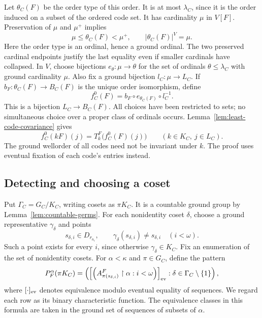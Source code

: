 Let $\theta_C(F)$ be the order type of this order. It is at most
$\lambda_C$, since it is the order induced on a subset of the ordered
code set. It has cardinality $\mu$ in $V[F]$. Preservation of $\mu$
and $\mu^+$ implies
\[
 \mu\le\theta_C(F)<\mu^+,
 \qquad |\theta_C(F)|^V=\mu.
\]
Here the order type is an ordinal, hence a ground ordinal. The two
preserved cardinal endpoints justify the last equality even if smaller
cardinals have collapsed. In $V$, choose bijections
$e_\theta:\mu\longrightarrow\theta$ for the set of ordinals
$\theta\le\lambda_C$ with ground cardinality $\mu$. Also fix a ground
bijection $l_C:\mu\longrightarrow L_C$. If
$b_F:\theta_C(F)\longrightarrow B_C(F)$ is the unique order
isomorphism, define
\[
 f_C^0(F)=b_F\circ e_{\theta_C(F)}\circ l_C^{-1}.
\]
This is a bijection $L_C\to B_C(F)$. All choices have been restricted
to sets; no simultaneous choice over a proper class of ordinals occurs.
Lemma~\ref{lem:least-code-covariance} gives
\begin{equation}\label{eq:preliminary-covariance}
 f_C^0(kF)(j)=T_k^F\bigl(f_C^0(F)(j)\bigr)
       \qquad(k\in K_C,\ j\in L_C).
\end{equation}
The ground wellorder of all codes need not be invariant under $k$.
The proof uses eventual fixation of each code's entries instead.

\subsection{Detecting and choosing a coset}

Put $\Gamma_C=G_C/K_C$, writing cosets as $\pi K_C$. It is a
countable ground
group by Lemma~\ref{lem:countable-germs}. For each nonidentity coset
$\delta$, choose a ground representative $\gamma_\delta$ and points
\[
 s_{\delta,i}\in D_{r_{n_i}},\qquad
 \gamma_\delta(s_{\delta,i})\ne s_{\delta,i}
       \quad(i<\omega).
\]
Such a point exists for every $i$, since otherwise
$\gamma_\delta\in K_C$. Fix an enumeration of the set of nonidentity
cosets. For $\alpha<\kappa$ and $\pi\in G_C$, define the pattern
\begin{equation}\label{eq:detector-pattern}
 P_F^\alpha(\pi K_C)=
 \left(
  \left[\left(A_{\pi(s_{\delta,i})}^F
                       \restriction\alpha:i<\omega\right)\right]_{\rm ev}
              :\delta\in\Gamma_C\setminus\{1\}\right),
\end{equation}
where $[\cdot]_{\rm ev}$ denotes equivalence modulo eventual equality
of sequences. We regard each row as its binary characteristic
function. The equivalence classes in this formula are taken in the
ground set of sequences of subsets of $\alpha$.

